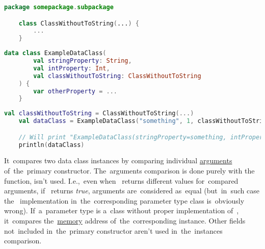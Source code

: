 \example
\begin{lstlisting}[language=Kotlin, title={Class without proper "toString" implementation}]
    package somepackage.subpackage

    class ClassWithoutToString(...) {
        ...
    }
\end{lstlisting}
\begin{lstlisting}[language=Kotlin, title={Data class}]
    data class ExampleDataClass(
        val stringProperty: String,
        val intProperty: Int,
        val classWithoutToString: ClassWithoutToString
    ) {
        var otherProperty = ...
    }
\end{lstlisting}
\newpage
\begin{lstlisting}[language=Kotlin, title={\itq{toString} behavior}]
    val classWithoutToString = ClassWithoutToString(...)
    val dataClass = ExampleDataClass("something", 1, classWithoutToString)

    // Will print "ExampleDataClass(stringProperty=something, intProperty=1, classWithoutToString= somepackage.subpackage.ClassWithoutToString@SOME_MESS)"
    println(dataClass)
\end{lstlisting}
\newline

\label{kotlindataclassequals}
It~compares two data class instances by comparing individual \hyperref[parameterargument]{arguments} of~the~primary constructor.
The~arguments comparison is done purely with \mbox{the } function,  isn't used.
I.e.,~even when~ returns different values for~compared arguments, \mbox{if } returns \textit{true}, arguments are~considered as~equal (but~in~such case \mbox{the } implementation in~the~corresponding parameter type class is~obviously wrong).
If~a~parameter type is a~class without proper implementation \mbox{of }, it~compares \mbox{the \hyperref[systemmemory]{memory}} address of~the~corresponding instance.
Other fields not~included in~the~primary constructor aren't used in~the~instances comparison.
\newline

